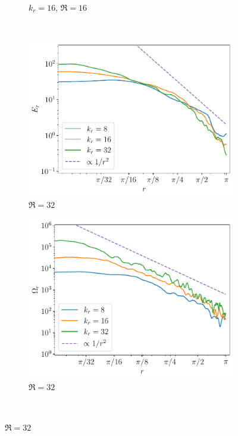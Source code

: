 \documentclass[../main.tex]{subfiles}
\begin{document}
\begin{figure}[!ht]
\begin{subfigure}{0.44\textwidth}
		\caption{$k_r = 16$, $\Re = 16$}
	\end{subfigure}\\[0.5cm]
	\begin{subfigure}{0.44\textwidth}
		\centering
		\includegraphics[width=\textwidth]{images/Energy_kdn.test7.059.pdf}
		\caption{$\Re = 32$}
	\end{subfigure}\hspace{0.04\textwidth}
	\begin{subfigure}{0.44\textwidth}
		\centering
		\includegraphics[width=\textwidth]{images/Enstrophy_kdn.test7.059.pdf}
		\caption{$\Re = 32$}
	\end{subfigure}\\[0.5cm]

\end{figure}
\end{document}
